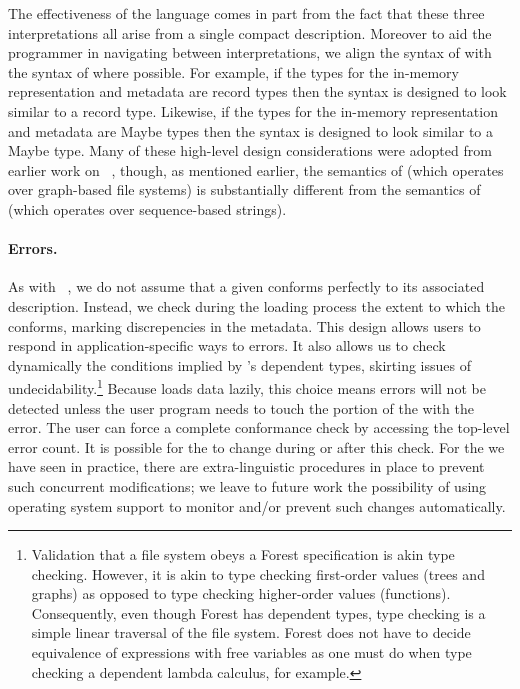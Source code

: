 The effectiveness of the \forest{} language comes in part from the fact 
that these three interpretations all arise from a single compact description.  
Moreover to aid the programmer in navigating between interpretations, we
align the syntax of \forest{} with the syntax of \haskell{} where possible.
For example, if the \haskell{} types for the in-memory representation and
metadata are record types then the \forest{} syntax is designed to look similar
to a \haskell{} record type.  Likewise,  if the \haskell{} types for the in-memory representation and
metadata are Maybe types then the \forest{} syntax is designed to look similar
to a \haskell{} Maybe type.  
Many of these high-level design considerations were adopted
from earlier work on 
\pads{}~\cite{fisher+:pads,fisher+:toplas,mandelbaum+:pads-ml}, though, 
as mentioned earlier,
the semantics of \forest{} (which operates over graph-based file systems)
is substantially different from the semantics
of \pads{} (which operates over sequence-based strings).

\paragraph{Errors.}
As with
\pads{}~\cite{fisher+:pads,fisher+:toplas,mandelbaum+:pads-ml}, we do
not assume that a given \filestore{} conforms perfectly to its associated
\forest{} description.  Instead, we check during the loading process
the extent to which the \filestore{} conforms, marking discrepencies
in the metadata.  This design allows users to respond in
application-specific ways to errors.  It also allows us to check
dynamically the conditions implied by \forest{}'s dependent types,
skirting issues of undecidability.\footnote{Validation that a file
system obeys a Forest specification is akin type checking.  However,
it is akin to type checking first-order values (trees and graphs)
as opposed to type checking higher-order values (functions).
Consequently, even though Forest has dependent types, type checking is 
a simple linear traversal of the file system.  Forest does not
have to decide equivalence of expressions with free variables as one  
must do when type checking a dependent lambda calculus, for example.}  
Because \forest{} loads data
lazily, this choice means errors will not be detected unless the user
program needs to touch the portion of the \filestore{} with the
error. The user can force a complete conformance check by accessing
the top-level error count.  It is possible for the
\filestore{} to change during or after this check.  For the
\filestores{} we have seen in practice, there are
extra-linguistic procedures in place to prevent such concurrent
modifications; we leave to future work the possibility of 
using operating system support to monitor and/or prevent
such changes automatically. 

